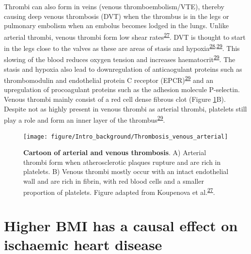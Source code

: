\documentclass[11pt,twoside]{bristolthesis}
\begin{document}
Thrombi can also form in veins (venous thromboembolism/VTE), thereby causing deep venous thrombosis (DVT) when the thrombus is in the legs or pulmonary embolism when an embolus becomes lodged in the lungs. Unlike arterial thrombi, venous thrombi form low shear rates\textsuperscript{\protect\hyperlink{ref-Koupenova2017a}{27}}. DVT is thought to start in the legs close to the valves as these are areas of stasis and hypoxia\textsuperscript{\protect\hyperlink{ref-Esmon2009}{28},\protect\hyperlink{ref-Stone2017}{29}}. This slowing of the blood reduces oxygen tension and increases haematocrit\textsuperscript{\protect\hyperlink{ref-Stone2017}{29}}. The stasis and hypoxia also lead to downregulation of anticaogulant proteins such as thrombomodulin and endothelial protein C receptor (EPCR)\textsuperscript{\protect\hyperlink{ref-Stone2017}{29}} and an upregulation of procoagulant proteins such as the adhesion molecule P-selectin. Venous thrombi mainly consist of a red cell dense fibrous clot (Figure \ref{fig:thrombi-cartoon}B). Despite not as highly present in venous thrombi as arterial thrombi, platelets still play a role and form an inner layer of the thrombus\textsuperscript{\protect\hyperlink{ref-Stone2017}{29}}.




\begin{figure}

{\centering \texttt{[image: figure/Intro\_background/Thrombosis\_venous\_arterial]} 

}

\caption[Cartoon of arterial and venous thrombosis]{\textbf{Cartoon of arterial and venous thrombosis}. A) Arterial thrombi form when atherosclerotic plaques rupture and are rich in platelets. B) Venous thrombi mostly occur with an intact endothelial wall and are rich in fibrin, with red blood cells and a smaller proportion of platelets. Figure adapted from Koupenova et al.\textsuperscript{\protect\hyperlink{ref-Koupenova2017a}{27}}.}\label{fig:thrombi-cartoon}
\end{figure}
\hypertarget{higher-bmi-has-a-causal-effect-on-ischaemic-heart-disease}{%
\section{Higher BMI has a causal effect on ischaemic heart disease}\label{higher-bmi-has-a-causal-effect-on-ischaemic-heart-disease}}
\end{document}
